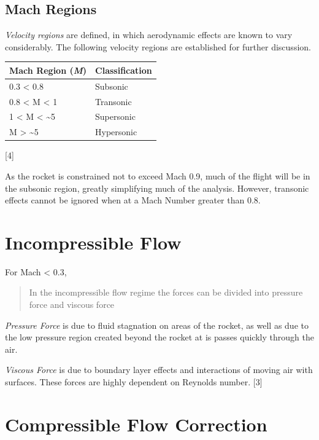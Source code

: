 \documentclass[]{book}
\begin{document}
\subsection{Mach Regions}\label{mach-regions}

\emph{Velocity regions} are defined, in which aerodynamic effects are
known to vary considerably. The following velocity regions are
established for further discussion.

\begin{longtable}[c]{@{}ll@{}}
\toprule
Mach Region (\emph{M}) & Classification\tabularnewline
\midrule
\endhead
0.3 \textless{} 0.8 & Subsonic\tabularnewline
0.8 \textless{} M \textless{} 1 & Transonic\tabularnewline
1 \textless{} M \textless{} \textasciitilde{}5 &
Supersonic\tabularnewline
M \textgreater{} \textasciitilde{}5 & Hypersonic\tabularnewline
\bottomrule
\end{longtable}


{[}4{]}

As the rocket is constrained not to exceed Mach 0.9, much of the flight
will be in the subsonic region, greatly simplifying much of the
analysis. However, transonic effects cannot be ignored when at a Mach
Number greater than 0.8.

\clearpage

\section{Incompressible Flow}\label{incompressible-flow}

For Mach \textless{} 0.3,

\begin{quote}
In the incompressible flow regime the forces can be divided into
pressure force and viscous force
\end{quote}

\emph{Pressure Force} is due to fluid stagnation on areas of the rocket,
as well as due to the low pressure region created beyond the rocket at
is passes quickly through the air.

\emph{Viscous Force} is due to boundary layer effects and interactions
of moving air with surfaces. These forces are highly dependent on
Reynolds number. {[}3{]}

\section{Compressible Flow
Correction}\label{compressible-flow-correction}
\end{document}
